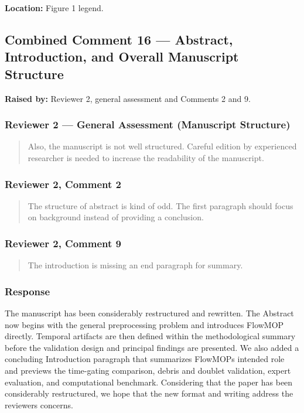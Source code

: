 \documentclass[
  11pt,
  a4paper,
]{article}
\begin{document}
\textbf{Location:} Figure 1 legend.

\subsection{Combined Comment 16 --- Abstract, Introduction, and Overall
Manuscript
Structure}\label{combined-comment-16--abstract-introduction-and-overall-manuscript-structure}

\textbf{Raised by:} Reviewer 2, general assessment and Comments 2 and 9.

\subsubsection{Reviewer 2 --- General Assessment (Manuscript
Structure)}\label{reviewer-2--general-assessment-manuscript-structure}

\begin{quote}
Also, the manuscript is not well structured. Careful edition by
experienced researcher is needed to increase the readability of the
manuscript.
\end{quote}

\subsubsection{Reviewer 2, Comment 2}\label{reviewer-2-comment-2}

\begin{quote}
The structure of abstract is kind of odd. The first paragraph should
focus on background instead of providing a conclusion.
\end{quote}

\subsubsection{Reviewer 2, Comment 9}\label{reviewer-2-comment-9}

\begin{quote}
The introduction is missing an end paragraph for summary.
\end{quote}

\subsubsection{Response}\label{response-15}

The manuscript has been considerably restructured and rewritten. The
Abstract now begins with the general preprocessing problem and
introduces FlowMOP directly. Temporal artifacts are then defined within
the methodological summary before the validation design and principal
findings are presented. We also added a concluding Introduction
paragraph that summarizes FlowMOP\textquotesingle s intended role and
previews the time-gating comparison, debris and doublet validation,
expert evaluation, and computational benchmark. Considering that the
paper has been considerably restructured, we hope that the new format
and writing address the reviewer\textquotesingle s concerns.
\end{document}
